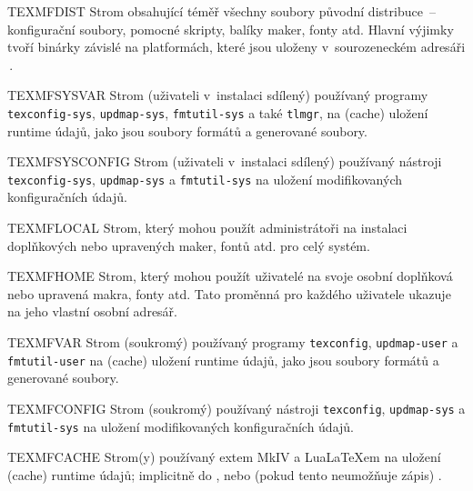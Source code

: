 \documentclass[\classoptions,slovak,english,czech]{\classname}
\begin{document}
\begin{ttdescription}
\item [TEXMFDIST] Strom obsahující téměř všechny soubory původní 
distribuce~-- konfigurační soubory, pomocné skripty, balíky maker,
fonty atd. Hlavní výjimky tvoří binárky závislé na platformách, 
které jsou uloženy v~sourozeneckém adresáři \,. 
%
\item [TEXMFSYSVAR] Strom (uživateli v~instalaci sdílený) 
používaný programy 
\verb+texconfig-sys+, \verb+updmap-sys+, \verb+fmtutil-sys+ 
a také \verb+tlmgr+, na (cache) uložení runtime
údajů, jako jsou soubory formátů a generované  soubory.
%
\item [TEXMFSYSCONFIG] Strom (uživateli v~instalaci sdílený) 
používaný nástroji 
\verb+texconfig-sys+, \verb+updmap-sys+ a \verb+fmtutil-sys+ 
na uložení modifikovaných konfiguračních údajů.
%
\item [TEXMFLOCAL] Strom, který mohou použít administrátoři na instalaci 
doplňkových nebo upravených maker, fontů atd. pro celý systém.
%
\item [TEXMFHOME] Strom, který mohou použít uživatelé 
na svoje osobní doplňková nebo upravená makra, fonty atd.
Tato proměnná pro
každého uživatele ukazuje na jeho vlastní osobní adresář. 

%
\item [TEXMFVAR] Strom (soukromý) používaný programy \verb+texconfig+, 
\verb+updmap-user+ a \verb+fmtutil-user+ na (cache) uložení runtime
údajů, jako jsou soubory formátů a generované  soubory.
%
\item [TEXMFCONFIG] Strom (soukromý) používaný nástroji  
\verb+texconfig+, \verb+updmap-sys+ a \verb+fmtutil-sys+ na uložení
modifikovaných konfiguračních údajů.
%
\item [TEXMFCACHE] Strom(y) používaný \ConTeXt{}extem 
MkIV a Lua\LaTeX{}em
na uložení (cache) runtime údajů; implicitně do , 
nebo (pokud tento neumožňuje zápis) .
\end{ttdescription}
\end{document}
